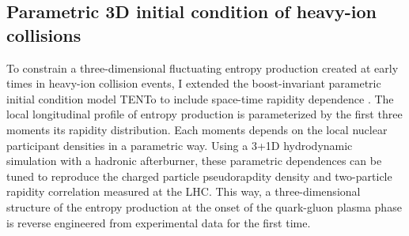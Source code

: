 \documentclass[12pt,a4paper]{article}
\begin{document}
\subsection{Parametric 3D initial condition of heavy-ion collisions}
To constrain a three-dimensional fluctuating entropy production created at early times in heavy-ion collision events, I extended the boost-invariant parametric initial condition model TENTo to include space-time rapidity dependence \cite{Ke:2016jrd}. 
The local longitudinal profile of entropy production is parameterized by the first three moments its rapidity distribution. 
Each moments depends on the local nuclear participant densities in a parametric way. 
Using a 3+1D hydrodynamic simulation with a hadronic afterburner, these parametric dependences can be tuned to reproduce the charged particle pseudorapdity density and two-particle rapidity correlation measured at the LHC. 
This way, a three-dimensional structure of the entropy production at the onset of the quark-gluon plasma phase is reverse engineered from experimental data for the first time.   



\end{document}
